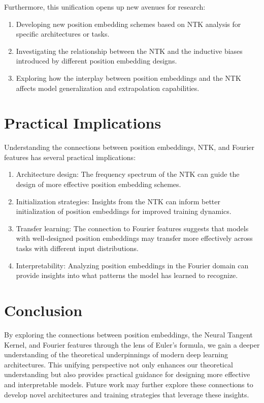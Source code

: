 \documentclass{article}
\begin{document}
Furthermore, this unification opens up new avenues for research:

\begin{enumerate}
    \item Developing new position embedding schemes based on NTK analysis for specific architectures or tasks.
    \item Investigating the relationship between the NTK and the inductive biases introduced by different position embedding designs.
    \item Exploring how the interplay between position embeddings and the NTK affects model generalization and extrapolation capabilities.
\end{enumerate}

\section{Practical Implications}

Understanding the connections between position embeddings, NTK, and Fourier features has several practical implications:

\begin{enumerate}
    \item Architecture design: The frequency spectrum of the NTK can guide the design of more effective position embedding schemes.
    \item Initialization strategies: Insights from the NTK can inform better initialization of position embeddings for improved training dynamics.
    \item Transfer learning: The connection to Fourier features suggests that models with well-designed position embeddings may transfer more effectively across tasks with different input distributions.
    \item Interpretability: Analyzing position embeddings in the Fourier domain can provide insights into what patterns the model has learned to recognize.
\end{enumerate}

\section{Conclusion}

By exploring the connections between position embeddings, the Neural Tangent Kernel, and Fourier features through the lens of Euler's formula, we gain a deeper understanding of the theoretical underpinnings of modern deep learning architectures. This unifying perspective not only enhances our theoretical understanding but also provides practical guidance for designing more effective and interpretable models. Future work may further explore these connections to develop novel architectures and training strategies that leverage these insights.



\end{document}
